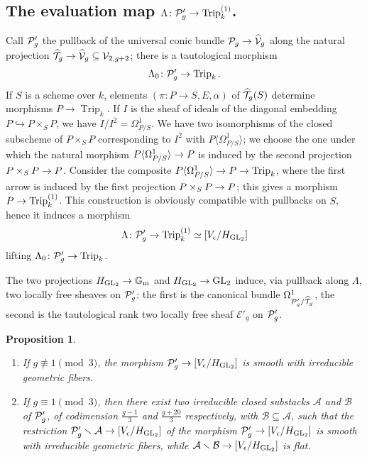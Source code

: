 \documentclass{amsart}
\numberwithin{equation}{section}
\numberwithin{subsection}{section}
\newenvironment{enumeratea}
{\begin{enumerate}[\upshape (a)]}
{\end{enumerate}}
\newtheorem{proposition}[theorem]{Proposition}
\theoremstyle{definition}
\theoremstyle{remark}
\newcommand\cA{\mathcal{A}} \newcommand\cB{\mathcal{B}}
\newcommand\cE{\mathcal{E}} \newcommand\cF{\mathcal{F}}
\newcommand\arr{\ifinner\to\else\longrightarrow\fi}
\newcommand\into{\hookrightarrow}
\newcommand\generate[1]{\langle #1 \rangle}
\renewcommand{\setminus}{\smallsetminus}
\newcommand{\OT}[1][g]{\widehat{\cT}_{#1}}
\newcommand{\trip}{\operatorname{Trip}}
\newcommand{\GL}{\mathrm{GL}}
\newcommand{\gm}{\mathbb{G}_{\mathrm{m}}}
\newcommand\Hg{H_{\GL_2}}
\newcommand\Ve{V_{\epsilon}}
\begin{document}
\subsection{The evaluation map $\Lambda\colon \cP_g' \arr \trip_k^{(1)}$.} Call $\mathcal{P}_g'$ the pullback of the universal conic bundle $\cP_g \arr \widehat{\cV}_{g}$ along the natural projection $\OT\arr \widehat{\cV}_{g} \subseteq \cV_{2,g+2}$; there is a tautological morphism
   \[
   \Lambda_{0}\colon \cP'_{g} \arr \trip_{k}.
   \]
If $S$ is a scheme over $k$, elements $(\pi\colon P\rightarrow S,E,\alpha)$ of $\OT (S)$ determine morphisms $P\rightarrow \trip_k$. If $I$ is the sheaf of ideals of the diagonal embedding $P \into P\times_{S}P$, we have $I/I^{2} = \Omega_{P/S}^{1}$. We have two isomorphisms of the closed subscheme of $P\times_{S}P$ corresponding to $I^{2}$ with $P\generate{\Omega_{P/S}^{1}}$; we choose the one under which the natural morphism $P\generate{\Omega_{P/S}^{1}} \arr P$ is induced by the second projection $P\times_{S}P \arr P$. Consider the composite $P\generate{\Omega_{P/S}^{1}} \arr P \arr \trip_{k}$, where the first arrow is induced by the first projection $P\times_{S}P \arr P$; this gives a morphism $P \arr \trip_{k}^{(1)}$. This construction is obviously compatible with pullbacks on $S$, hence it induces a morphism
   \[
   \Lambda\colon \cP'_{g} \arr \trip_{k}^{(1)} \simeq [\Ve/\Hg]
   \]
lifting $\Lambda_{0}\colon \cP'_{g} \arr \trip_{k}$. 

The two projections $\Hg \arr \gm$ and $\Hg \arr \GL_{2}$ induce, via pullback along $\Lambda$, two locally free sheaves on $\mathcal{P}'_{g}$; the first is the canonical bundle $\Omega^1_{\cP'_g/\OT}$, the second is the tautological rank two locally free sheaf $\cE'_{g}$ on $\mathcal{P}'_{g}$.

\begin{proposition}\label{prop:valuation-map}\hfil
\begin{enumeratea}

\item If $g \not\equiv 1 \pmod 3$, the morphism $\cP'_{g} \arr [\Ve/\Hg]$ is smooth with irreducible geometric fibers.

\item If $g \equiv 1 \pmod 3$, then there exist two irreducible closed substacks $\cA$  and $\cB$ of $\mathcal{P}'_{g}$, of codimension  $\frac{g-1}{3}$ and $\frac{g+20}{3}$ respectively, with $\cB \subseteq \cA$, such that the restriction $\cP'_{g} \setminus \cA \arr [\Ve/\Hg]$ of the morphism $\cP'_{g} \arr [\Ve/\Hg]$ is smooth with irreducible geometric fibers, while  $\cA \setminus \cB \arr [\Ve/\Hg]$ is flat.

\end{enumeratea}
\end{proposition}
\end{document}

